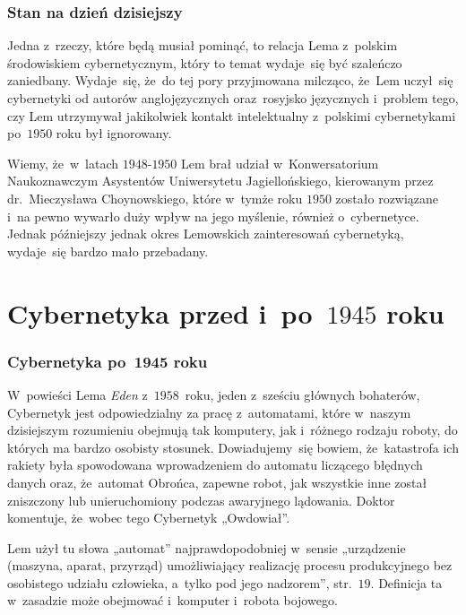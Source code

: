 \documentclass[10pt,t]{beamer}
\begin{document}
\begin{frame}
  \frametitle{Stan na dzień dzisiejszy}


  Jedna z~rzeczy, które będą musiał pominąć, to relacja Lema z~polskim
  środowiskiem cybernetycznym, który to temat wydaje~się być szaleńczo
  zaniedbany. Wydaje~się, że~do tej pory przyjmowana milcząco, że~Lem
  uczył~się cybernetyki od autorów anglojęzycznych oraz~rosyjsko języcznych
  i~problem tego, czy Lem utrzymywał jakikolwiek kontakt intelektualny
  z~polskimi cybernetykami po~$1950$ roku był ignorowany.

  Wiemy, że~w~latach $1948\text{-}1950$ Lem brał udział w~Konwersatorium
  Naukoznawczym Asystentów Uniwersytetu Jagiellońskiego, kierowanym
  przez dr.~Mieczysława Choynowskiego, które w~tymże roku $1950$ zostało
  rozwiązane i~na pewno wywarło duży wpływ na jego myślenie,
  również o~cybernetyce. Jednak późniejszy jednak okres Lemowskich
  zainteresowań cybernetyką, wydaje~się bardzo mało przebadany.

\end{frame}









\section{Cybernetyka przed i~po~$1945$ roku}


\begin{frame}
  \frametitle{Cybernetyka po~1945 roku}


  W~powieści Lema \textit{Eden} z~$1958$~roku, jeden z~sześciu głównych
  bohaterów, Cybernetyk jest odpowiedzialny za pracę z~automatami, które
  w~naszym dzisiejszym rozumieniu obejmują tak komputery, jak i~różnego
  rodzaju roboty, do których ma bardzo osobisty stosunek. Dowiadujemy~się
  bowiem, że~katastrofa
  ich rakiety była spowodowana wprowadzeniem do automatu liczącego błędnych
  danych oraz, że~automat Obrońca, zapewne robot, jak wszystkie inne
  został zniszczony lub unieruchomiony podczas awaryjnego lądowania. Doktor
  komentuje, że~wobec tego Cybernetyk „Owdowiał”.

  Lem użył tu słowa „automat” najprawdopodobniej w~sensie „urządzenie
  (maszyna, aparat, przyrząd) umożliwiający realizację procesu
  produkcyjnego bez osobistego udziału człowieka, a~tylko pod jego
  nadzorem”, str.~$19$. Definicja ta w~zasadzie może obejmować i~komputer
  i~robota bojowego.

\end{frame}
\end{document}
